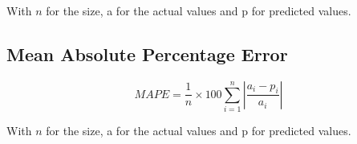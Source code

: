 With $n$ for the size, a for the actual values and p for predicted values.\\

\subsection{Mean Absolute Percentage Error}

\begin{equation}
MAPE = \frac{1}{n}\times 100 \sum_{i=1}^{n} \left|\frac{a_i-p_i}{a_i}\right|
\end{equation}

With $n$ for the size, a for the actual values and p for predicted values.\\





%
%
%

